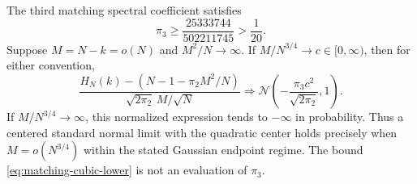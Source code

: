 \documentclass[11pt,letterpaper]{article}
\begin{document}
\begin{proposition}
\label{prop:matching-cubic-positive}
The third matching spectral coefficient satisfies
\begin{equation}\label{eq:matching-cubic-lower}
 \pi_3\ge\frac{25333744}{502211745}>\frac1{20}.
\end{equation}
Suppose $M=N-k=o(N)$ and $M^2/N\to\infty$.
If $M/N^{3/4}\to c\in[0,\infty)$, then for either convention,
\begin{equation}\label{eq:quadratic-center-critical-shift}
 \frac{H_N(k)-(N-1-\pi_2M^2/N)}
                   {\sqrt{2\pi_2}\,M/\sqrt N}
   \Longrightarrow
       \mathcal N\left(-\frac{\pi_3c^2}{\sqrt{2\pi_2}},1\right).
\end{equation}
If $M/N^{3/4}\to\infty$, this normalized expression tends to
$-\infty$ in probability. Thus a centered standard normal limit
with the quadratic center holds precisely when $M=o(N^{3/4})$
within the stated Gaussian endpoint regime.
The bound \eqref{eq:matching-cubic-lower} is not an evaluation of
$\pi_3$.
\end{proposition}
\end{document}
